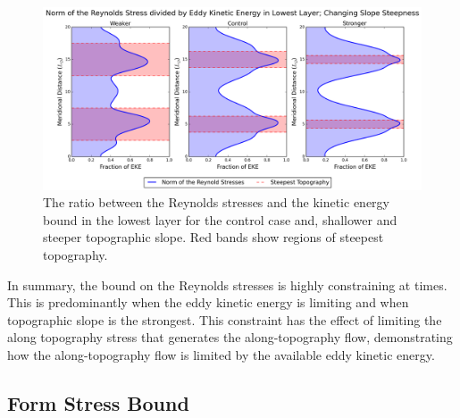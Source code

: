 \documentclass[12pt,a4paper]{report}
\begin{document}
\begin{figure}
	\centering
	\includegraphics[width=\linewidth]{normovereke_2_1}
	\caption{The ratio between the Reynolds stresses and the kinetic energy bound in
		the lowest layer for the control case and, shallower and steeper topographic slope. Red bands show regions of steepest topography. }
	\label{fig:normoverekewidth}
\end{figure}

In summary, the bound on the Reynolds stresses is highly constraining at times.
This is predominantly when the eddy kinetic energy is limiting and when topographic
slope is the strongest. This constraint has the effect of limiting the along 
topography stress that generates the along-topography flow, demonstrating how
the along-topography flow is limited by the available eddy kinetic energy.


\subsection{Form Stress Bound}
\end{document}
